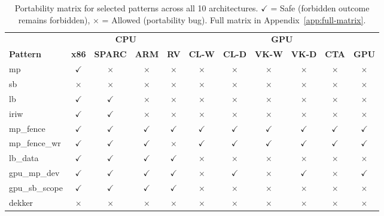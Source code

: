 \documentclass[10pt]{article}
\newcommand{\cmark}{$\checkmark$}
\newcommand{\xmark}{$\times$}
\begin{document}
\begin{table}[h]
\centering
\caption{Portability matrix for selected patterns across all 10
architectures. \cmark{} = Safe (forbidden outcome remains forbidden),
\xmark{} = Allowed (portability bug). Full matrix in Appendix~\ref{app:full-matrix}.}
\label{tab:portability-matrix}
\small
\begin{tabular}{l cccc cccccc}
\toprule
& \multicolumn{4}{c}{\textbf{CPU}} & \multicolumn{6}{c}{\textbf{GPU}} \\
\cmidrule(lr){2-5} \cmidrule(lr){6-11}
\textbf{Pattern} & \textbf{x86} & \textbf{SPARC} & \textbf{ARM} & \textbf{RV}
& \textbf{CL-W} & \textbf{CL-D} & \textbf{VK-W} & \textbf{VK-D} & \textbf{CTA} & \textbf{GPU} \\
\midrule
mp           & \cmark & \xmark & \xmark & \xmark & \xmark & \xmark & \xmark & \xmark & \xmark & \xmark \\
sb           & \xmark & \xmark & \xmark & \xmark & \xmark & \xmark & \xmark & \xmark & \xmark & \xmark \\
lb           & \cmark & \cmark & \xmark & \xmark & \xmark & \xmark & \xmark & \xmark & \xmark & \xmark \\
iriw         & \cmark & \cmark & \xmark & \xmark & \xmark & \xmark & \xmark & \xmark & \xmark & \xmark \\
mp\_fence    & \cmark & \cmark & \cmark & \cmark & \cmark & \cmark & \cmark & \cmark & \cmark & \cmark \\
mp\_fence\_wr& \cmark & \cmark & \cmark & \xmark & \cmark & \cmark & \cmark & \cmark & \cmark & \cmark \\
lb\_data     & \cmark & \cmark & \cmark & \cmark & \xmark & \xmark & \xmark & \xmark & \xmark & \xmark \\
gpu\_mp\_dev & \cmark & \cmark & \cmark & \cmark & \xmark & \cmark & \xmark & \cmark & \xmark & \cmark \\
gpu\_sb\_scope & \cmark & \cmark & \cmark & \cmark & \xmark & \xmark & \xmark & \xmark & \xmark & \xmark \\
dekker       & \xmark & \xmark & \xmark & \xmark & \xmark & \xmark & \xmark & \xmark & \xmark & \xmark \\
\bottomrule
\end{tabular}
\end{table}
\end{document}
